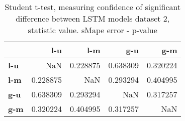 \begin{table}[h]
\centering
\caption{Student t-test, measuring confidence of significant difference between LSTM models dataset 2, statistic value. sMape error - p-value}
\label{table:ttest-p-values-lstm-experiments-sMAPE-dataset-2}
\begin{tabular}{lrrrr}
\toprule
{} &       l-u &       l-m &       g-u &       g-m \\
\midrule
\textbf{l-u} &       NaN &  0.228875 &  0.638309 &  0.320224 \\
\textbf{l-m} &  0.228875 &       NaN &  0.293294 &  0.404995 \\
\textbf{g-u} &  0.638309 &  0.293294 &       NaN &  0.317257 \\
\textbf{g-m} &  0.320224 &  0.404995 &  0.317257 &       NaN \\
\bottomrule
\end{tabular}
\end{table}
